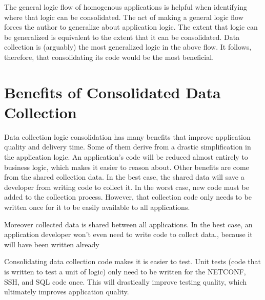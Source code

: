 The general logic flow of homogenous applications is helpful when identifying 
where that logic can be consolidated. The act of making a general logic flow 
forces the author to generalize about application logic. The extent that logic 
can be generalized is equivalent to the extent that it can be consolidated.
Data collection is (arguably) the most generalized logic in the above flow. It
follows, therefore, that consolidating its code would be the most beneficial.
\section{Benefits of Consolidated Data Collection}
\label{sec:intro:address}

Data collection logic consolidation has many benefits that improve application 
quality and delivery time. Some of them derive from a drastic simplification in
the application logic. An application's code will be reduced almost entirely to
business logic, which makes it easier to reason about. Other benefits are come
from the shared collection data. In the best case, the shared data will save a 
developer from writing code to collect it. In the worst case, new code must be
added to the collection process. However, that collection code only needs to be
written once for it to be easily available to all applications.

Moreover collected data
is shared between all applications. In the best case, an application developer won't even need to
write code to collect data., because it will have been written already

Consolidating data collection code makes it is easier to test. Unit tests
(code that is written to test a unit of logic) only need to be written for the 
NETCONF, SSH, and SQL code once. This will drastically improve testing quality,
which ultimately improves application quality.

